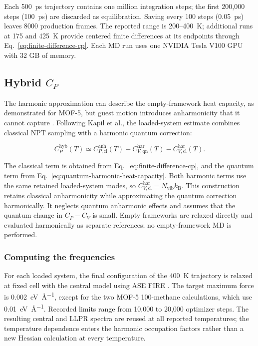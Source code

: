 \documentclass[12pt,a4paper]{article}
\numberwithin{equation}{section}
\begin{document}
Each \SI{500}{ps} trajectory contains one million integration steps; the
first 200,000 steps (\SI{100}{ps}) are discarded as equilibration.
Saving every 100 steps (\SI{0.05}{ps}) leaves 8000 production frames.
The reported range is 200--\SI{400}{K}; additional runs at 175 and
\SI{425}{K} provide centered finite differences at its endpoints through
Eq.~\eqref{eq:finite-difference-cp}.
Each MD run uses one NVIDIA Tesla V100 GPU with 32 GB of memory.

\subsection{Hybrid $C_P$}
\label{sec:hybrid-cp}

The harmonic approximation can describe the empty-framework heat capacity,
as demonstrated for MOF-5, but guest motion introduces anharmonicity that
it cannot capture \cite{kapil2019}. Following Kapil et al., the loaded-system
estimate combines classical NPT sampling with a harmonic quantum correction:

\begin{equation}
  C_P^{\mathrm{hyb}}(T)\simeq
    C_{P,\mathrm{cl}}^{\mathrm{anh}}(T)
    +C_{V,\mathrm{qn}}^{\mathrm{har}}(T)
    -C_{V,\mathrm{cl}}^{\mathrm{har}}(T).
  \label{eq:quantum-correction}
\end{equation}

The classical term is obtained from Eq.~\eqref{eq:finite-difference-cp},
and the quantum term from Eq.~\eqref{eq:quantum-harmonic-heat-capacity}.
Both harmonic terms use the same retained loaded-system modes, so
$C_{V,\mathrm{cl}}^{\mathrm{har}}=N_{\mathrm{vib}}k_{\mathrm B}$.
This construction retains classical anharmonicity while approximating the
quantum correction harmonically. It neglects quantum anharmonic effects
and assumes that the quantum change in $C_P-C_V$ is small.
Empty frameworks are relaxed directly and evaluated harmonically as separate
references; no empty-framework MD is performed.

\subsubsection{Computing the frequencies}

For each loaded system, the final configuration of the \SI{400}{K} trajectory
is relaxed at fixed cell with the central model using ASE FIRE
\cite{bitzek2006}. The target maximum force is
\SI{0.002}{\electronvolt\per\angstrom}, except for the two MOF-5
100-methane calculations, which use \SI{0.01}{\electronvolt\per\angstrom}.
Recorded limits range from 10,000 to 20,000 optimizer steps.
The resulting central and LLPR spectra are reused at all reported
temperatures; the temperature dependence enters the harmonic occupation
factors rather than a new Hessian calculation at every temperature.
\end{document}

